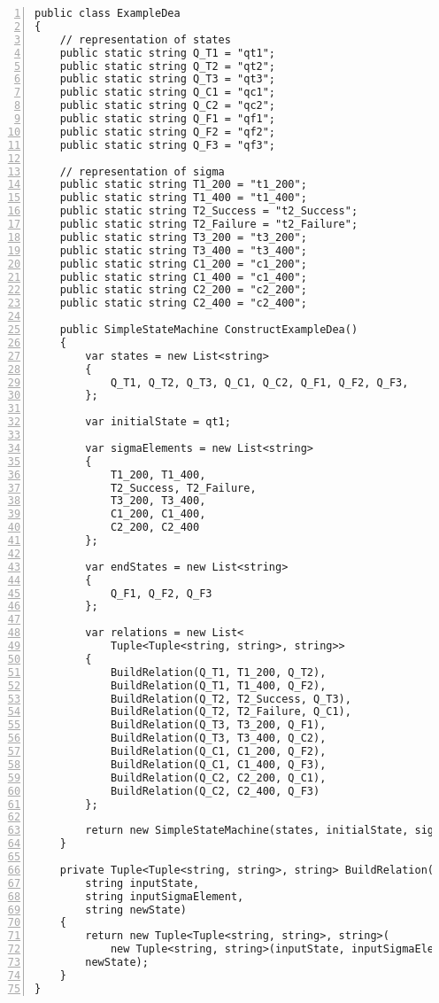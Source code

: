 \begin{lstlisting}[language={[Sharp]C}, breaklines=true, tabsize=2, showstringspaces=false, frame=single, numbers=left, basicstyle=\small,label = {lst:dea-model-example-csharp}, caption={Modellierung eines Beispiel DEA in C\#}, captionpos=b] 
public class ExampleDea
{
 	// representation of states
	public static string Q_T1 = "qt1";
	public static string Q_T2 = "qt2";
	public static string Q_T3 = "qt3";
	public static string Q_C1 = "qc1";
	public static string Q_C2 = "qc2";
	public static string Q_F1 = "qf1";
	public static string Q_F2 = "qf2";
	public static string Q_F3 = "qf3";
	
	// representation of sigma
	public static string T1_200 = "t1_200";
	public static string T1_400 = "t1_400";
	public static string T2_Success = "t2_Success";
	public static string T2_Failure = "t2_Failure";
	public static string T3_200 = "t3_200";
	public static string T3_400 = "t3_400";
	public static string C1_200 = "c1_200";
	public static string C1_400 = "c1_400";
	public static string C2_200 = "c2_200";
	public static string C2_400 = "c2_400";
	
	public SimpleStateMachine ConstructExampleDea()
	{
		var states = new List<string>
		{
			Q_T1, Q_T2, Q_T3, Q_C1, Q_C2, Q_F1, Q_F2, Q_F3,
		};
		
		var initialState = qt1;
		
		var sigmaElements = new List<string>
		{
			T1_200, T1_400,
			T2_Success, T2_Failure,
			T3_200, T3_400,
			C1_200, C1_400,
			C2_200, C2_400
		};
		
		var endStates = new List<string>
		{
			Q_F1, Q_F2, Q_F3
		};
		
		var relations = new List<
			Tuple<Tuple<string, string>, string>>
		{
			BuildRelation(Q_T1, T1_200, Q_T2),
			BuildRelation(Q_T1, T1_400, Q_F2),
			BuildRelation(Q_T2, T2_Success, Q_T3),
			BuildRelation(Q_T2, T2_Failure, Q_C1),
			BuildRelation(Q_T3, T3_200, Q_F1),
			BuildRelation(Q_T3, T3_400, Q_C2),
			BuildRelation(Q_C1, C1_200, Q_F2),
			BuildRelation(Q_C1, C1_400, Q_F3),
			BuildRelation(Q_C2, C2_200, Q_C1),
			BuildRelation(Q_C2, C2_400, Q_F3)
		};
		
		return new SimpleStateMachine(states, initialState, sigmaElements, endStates, relations); 
	}
	
	private Tuple<Tuple<string, string>, string> BuildRelation(
		string inputState, 
		string inputSigmaElement, 
		string newState)
	{
		return new Tuple<Tuple<string, string>, string>(
			new Tuple<string, string>(inputState, inputSigmaElement), 
		newState);
	}
}
\end{lstlisting}

